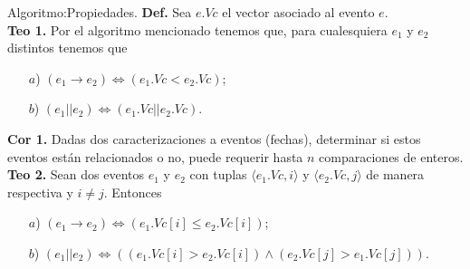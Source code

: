 \begin{frame}[fragile]{Algoritmo:}{Propiedades.}
  \justifying
  \textbf{Def.} Sea $e.Vc$ el vector asociado al evento $e$.\\[0.3cm]
  
  \textbf{Teo 1.} Por el algoritmo mencionado tenemos que, para cualesquiera
  $e_1$ y $e_2$ distintos tenemos que
  \begin{enumerate}
  \item[$a$)] $\left(e_1 \rightarrow e_2\right) \Leftrightarrow \left(e_1.Vc < e_2.Vc\right)$;
  \item[$b$)] $\left(e_1 || e_2\right) \Leftrightarrow \left(e_1.Vc || e_2.Vc\right)$.
  \end{enumerate}
  
  \textbf{Cor 1.} Dadas dos caracterizaciones a eventos (fechas), determinar si estos
  eventos están relacionados o no, puede requerir hasta $n$ comparaciones de enteros.
  \\[0.3cm]
  
  \textbf{Teo 2.} Sean dos eventos $e_1$ y $e_2$ con tuplas $\langle e_1.Vc, i \rangle$
  y $\langle e_2.Vc, j\rangle$ de manera respectiva y $i \not= j$. Entonces
  \begin{enumerate}
  \item[$a$)] $\left(e_1 \rightarrow e_2\right) \Leftrightarrow
    \left(e_1.Vc[i] \leq e_2.Vc[i]\right)$;
  \item[$b$)] $\left(e_1 || e_2\right) \Leftrightarrow
    \left((e_1.Vc[i] > e_2.Vc[i]) \land (e_2.Vc[j] > e_1.Vc[j])\right)$.
  \end{enumerate}
\end{frame}
